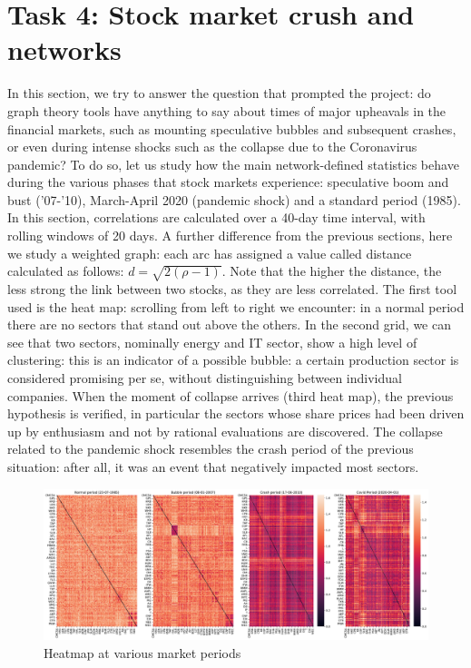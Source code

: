 \documentclass[sigchi]{acmart}
\begin{document}
\section{Task 4: Stock market crush and networks}

In this section, we try to answer the question that prompted the project: do graph theory tools have anything to say about times of major upheavals in the financial markets, such as mounting speculative bubbles and subsequent crashes, or even during intense shocks such as the collapse due to the Coronavirus pandemic? To do so, let us study how the main network-defined statistics behave during the various phases that stock markets experience: speculative boom and bust ('07-'10), March-April 2020 (pandemic shock) and a standard period (1985). In this section, correlations are calculated over a 40-day time interval, with rolling windows of 20 days.
A further difference from the previous sections, here we study a weighted graph: each arc has assigned a value called distance calculated as follows: $ d = \sqrt{2(\rho-1)}$. Note that the higher the distance, the less strong the link between two stocks, as they are less correlated.
The first tool used is the heat map: scrolling from left to right we encounter: in a normal period there are no sectors that stand out above the others. In the second grid, we can see that two sectors, nominally energy and IT sector, show a high level of clustering: this is an indicator of a possible bubble: a certain production sector is considered promising per se, without distinguishing between individual companies. When the moment of collapse arrives (third heat map), the previous hypothesis is verified, in particular the sectors whose share prices had been driven up by enthusiasm and not by rational evaluations are discovered.
The collapse related to the pandemic shock resembles the crash period of the previous situation: after all, it was an event that negatively impacted most sectors.
\begin{figure}[H]
	\centering
	\includegraphics[width=\linewidth]{heatmap a confronto.pdf}
	\caption{Heatmap at various market periods}
\end{figure}
\end{document}
